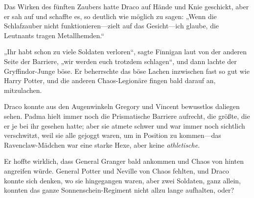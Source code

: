 Das Wirken des fünften Zaubers hatte Draco auf Hände und Knie geschickt, aber er sah auf und schaffte es, so deutlich wie möglich zu sagen: „Wenn die Schlafzauber nicht funktionieren—zielt auf das Gesicht—ich glaube, die Leutnants tragen Metallhemden.“

„Ihr habt schon zu viele Soldaten verloren“, sagte Finnigan laut von der anderen Seite der Barriere, „wir werden euch trotzdem schlagen“, und dann lachte der Gryffindor-Junge böse. Er beherrschte das böse Lachen inzwischen fast so gut wie Harry Potter, und die anderen Chaos-Legionäre fingen bald darauf an, mitzulachen.

Draco konnte aus den Augenwinkeln Gregory und Vincent bewusstlos daliegen sehen. Padma hielt immer noch die Prismatische Barriere aufrecht, die größte, die er je bei ihr gesehen hatte; aber sie atmete schwer und war immer noch sichtlich verschwitzt, weil sie alle gejoggt waren, um in Position zu kommen—das Ravenclaw-Mädchen war eine starke Hexe, aber keine \emph{athletische}.

Er hoffte wirklich, dass General Granger bald ankommen und Chaos von hinten angreifen würde. General Potter und Neville von Chaos fehlten, und Draco konnte sich denken, wo sie hingegangen waren, aber zwei Soldaten, ganz allein, konnten das ganze Sonnenschein-Regiment nicht allzu lange aufhalten, oder?

\later

